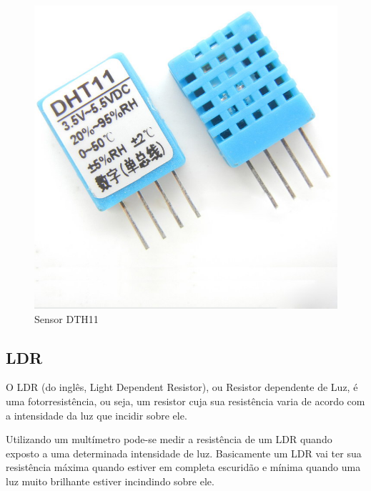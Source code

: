 \begin{figure}[ht]
      \centering
      \includegraphics[scale=0.20]{figuras/FDHT11.jpg}
      \caption{Sensor DTH11}
      \label{fig:Sdth11}
\end{figure}

\subsection{LDR}

O LDR (do inglês, Light Dependent Resistor), ou Resistor dependente de Luz, é uma fotorresistência, ou seja, um resistor cuja sua resistência varia de acordo com a intensidade da luz que incidir sobre ele. 

Utilizando um multímetro pode-se medir a resistência de um LDR quando exposto a uma determinada intensidade de luz. Basicamente um LDR vai ter sua resistência máxima quando estiver em completa escuridão e mínima quando uma luz muito brilhante estiver incindindo sobre ele.


